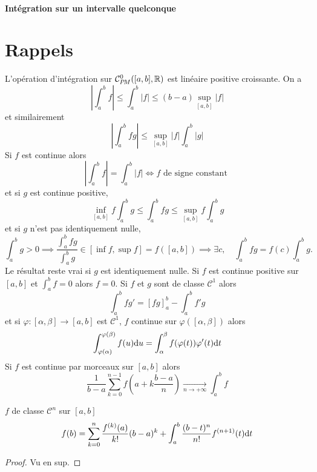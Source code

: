 \ifsolo
    ~

    \vspace{1cm}

    \begin{center}
        \textbf{\LARGE Intégration sur un intervalle quelconque} \\[1em]
    \end{center}
    \tableofcontents
\else
    \minitoc
\fi
\thispagestyle{empty}

\ifsolo \newpage \setcounter{page}{1} \fi

\section{Rappels}

L'opération d'intégration sur $\CPM([a, b], \mathbb R)$ est linéaire positive croissante. On a \[
    \left| \int_a^bf \right|\leq \int_a^b|f|\leq (b-a)\sup_{[a,b]} |f|
\]
et similairement \[
    \left| \int_a^bfg \right|\leq \sup_{[a,b]}|f|\int_a^b|g|
\]
Si $f$ est continue alors \[
    \left| \int_a^bf \right|=\int_a^b|f|\iff f\text{ de signe constant }
\]
et si $g$ est continue positive, \[
    \inf_{[a,b]}f\int_a^bg\leq \int_a^bfg\leq \sup_{[a,b]}f\int_a^bg
\]
et si $g$ n'est pas identiquement nulle, \[
    \int_a^bg>0\implies \dfrac{\int_a^bfg}{\int_a^bg}\in[\inf f,\sup f]=f([a,b])\implies \exists c, \quad \int_a^bfg=f(c)\int_a^bg.
\]
Le résultat reste vrai si $g$ est identiquement nulle. Si $f$ est continue positive sur $[a, b]$ et $\int_a^bf=0$ alors $f=0$.
Si $f$ et $g$ sont de classe $\mathcal C^1$ alors \[
    \int_a^bfg'=[fg]_a^b-\int_a^bf'g
\]
et si $\varphi:[\alpha,\beta]\to[a,b]$ est $\mathcal C^1$, $f$ continue sur $\varphi([\alpha,\beta])$ alors \[
    \int_{\varphi(\alpha)}^{\varphi(\beta)}f(u)\mathrm{d} u=\int_\alpha^\beta f(\varphi(t))\varphi'(t)\mathrm{d} t
\]
Si $f$ est continue par morceaux sur $[a, b]$ alors \[
    \frac1{b-a}\sum_{k=0}^{n-1}f \left( a+k\frac{b-a}n \right)\xrightarrow[n\to+\infty]{}\int_a^bf
\]

\begin{thm}
    \Hyp $f$ de classe $\mathcal C^n$ sur $[a, b]$
    \Conc \[
        f(b)=\sum_{k=0}^n\frac{f^{(k)}(a)}{k!}(b-a)^k+\int_a^b\frac{(b-t)^n}{n!}f^{(n+1)}(t)\mathrm{d} t
    \]
\end{thm}

\begin{proof}
    Vu en sup.
\end{proof}

